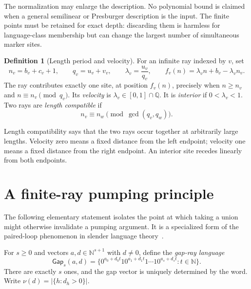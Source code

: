 \documentclass[11pt,letterpaper]{article}
\theoremstyle{definition}
\newtheorem{definition}[theorem]{Definition}
\theoremstyle{remark}
\newcommand{\N}{\mathbb N}
\newcommand{\Q}{\mathbb Q}
\begin{document}
The normalization may enlarge the description. No polynomial bound is
claimed when a general semilinear or Presburger description is the input.
The finite points must be retained for exact depth: discarding them is
harmless for language-class membership but can change the largest number
of simultaneous marker sites.

\begin{definition}[Length period and velocity]\label{ccc:cl:def:velocity}
For an infinite ray indexed by $v$, set
\[
 n_v=b_v+c_v+1,\qquad q_v=u_v+v_v,\qquad
 \lambda_v=\frac{u_v}{q_v},\qquad
 f_v(n)=\lambda_v n+b_v-\lambda_v n_v.
\]
The ray contributes exactly one site, at position $f_v(n)$, precisely
when $n\ge n_v$ and $n\equiv n_v\pmod{q_v}$.
Its \emph{velocity} is $\lambda_v\in[0,1]\cap\Q$.
It is \emph{interior} if $0<\lambda_v<1$.
Two rays are \emph{length compatible} if
\begin{equation}\label{ccc:cl:eq:crtcompatible}
 n_v\equiv n_w\pmod{\gcd(q_v,q_w)}.
\end{equation}
\end{definition}

Length compatibility says that the two rays occur together at arbitrarily
large lengths. Velocity zero means a fixed distance from the left endpoint;
velocity one means a fixed distance from the right endpoint. An interior
site recedes linearly from both endpoints.

\section{A finite-ray pumping principle}\label{ccc:cl:sec:pumping}

The following elementary statement isolates the point at which taking a
union might otherwise invalidate a pumping argument. It is a specialized
form of the paired-loop phenomenon in slender language theory~\cite{Raz}.

For $s\ge0$ and vectors $a,d\in\N^{s+1}$ with $d\ne0$, define the
\emph{gap-ray language}
\begin{equation}\label{ccc:cl:eq:gapray}
 \mathsf{Gap}_s(a,d)=
 \{0^{a_0+d_0t}1 0^{a_1+d_1t}1\cdots1 0^{a_s+d_st}:t\in\N\}.
\end{equation}
There are exactly $s$ ones, and the gap vector is uniquely determined by
the word. Write $\nu(d)=|\{h:d_h>0\}|$.
\end{document}
